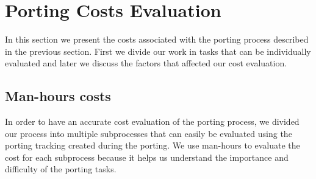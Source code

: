 \section{Porting Costs Evaluation}

%
%

In this section we present the costs associated with the porting process
described in the previous section. First we divide our work in tasks that can
be individually evaluated and later we discuss the factors that affected our
cost evaluation.

\subsection{Man-hours costs}

In order to have an accurate cost evaluation of the porting process, we divided
our process into multiple subprocesses that can easily be evaluated using the
porting tracking created during the porting. We use man-hours to evaluate the
cost for each subprocess because it helps us understand the importance and
difficulty of the porting tasks.

